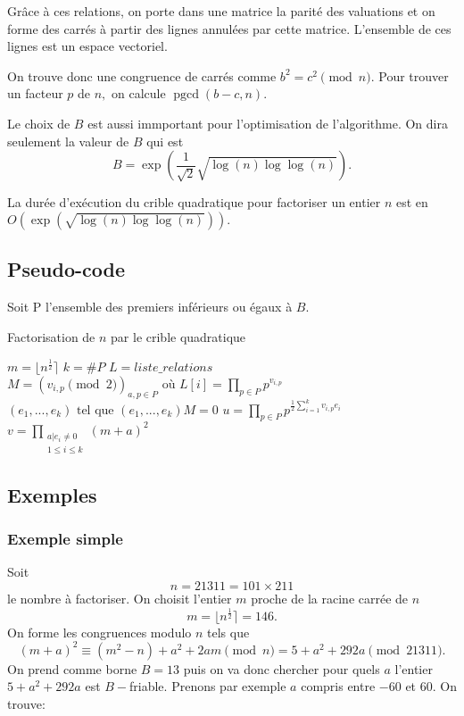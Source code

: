 \documentclass[french, 12pt, titlepage]{article}
\DeclareMathOperator{\pgcd}{pgcd}
\begin{document}
Grâce à ces relations, on porte dans une matrice la parité des valuations et on forme des carrés à partir des lignes annulées par cette matrice. L'ensemble de ces lignes est un espace vectoriel.

On trouve donc une congruence de carrés comme $b^2 = c^2 \pmod n.$ Pour trouver un facteur $p$ de $n,$ on calcule $\pgcd(b - c, n).$

Le choix de $B$ est aussi immportant pour l'optimisation de l'algorithme. On dira seulement la valeur de $B$ qui est \[ B = \exp \left( \frac{1}{\sqrt{2}} \sqrt{\log(n)\log\log(n)} \right) . \]

La durée d'exécution du crible quadratique pour factoriser un entier $n$ est en $O(\exp\left(\sqrt{\log (n) \log \log (n)}\right)).$

\subsection{Pseudo-code}
Soit P l'ensemble des premiers inférieurs ou égaux à $B.$

\begin{algorithm}
\caption{Factorisation de $n$ par le crible quadratique}
\BlankLine
$m = \lfloor n^{\frac{1}{2}} \rceil$\;
$k = \#P$\;
$L = liste\_relations$\;
$M = (v_{i, p} \pmod 2)_{a, p \in P} \text{ où } L[i] = \prod\limits_{p \in P}p^{v_{i,p}}$\;
$(e_1, ..., e_k) \text{ tel que } (e_1, ..., e_k)M = 0$\;
$u = \prod\limits_{p \in P} p^{\frac{1}{2} \sum\limits_{i=1}^k v_{i, p}e_i}$\;
$v = \prod\limits_{\substack{a | e_i \neq 0 \\ 1 \leq i \leq k}} (m + a)^2$\;
\Return{$\pgcd(u - v, n)$}
\end{algorithm}

\subsection{Exemples}
\subsubsection{Exemple simple}

Soit \[n = 21311 = 101 \times 211\] le nombre à factoriser. On choisit l'entier $m$ proche de la racine carrée de $n$ \[ m = \lfloor n^{\frac{1}{2}} \rceil = 146 .\]
On forme les congruences modulo $n$ tels que \[  (m + a)^2 \equiv (m^2 - n) + a^2 + 2am \pmod n = 5 + a^2 + 292a \pmod{21311} .\]
On prend comme borne $B = 13$ puis on va donc chercher pour quels $a$ l'entier $5 + a^2 + 292a$ est $B-$friable. Prenons par exemple $a$ compris entre $-60$ et $60$.
On trouve:
\end{document}
